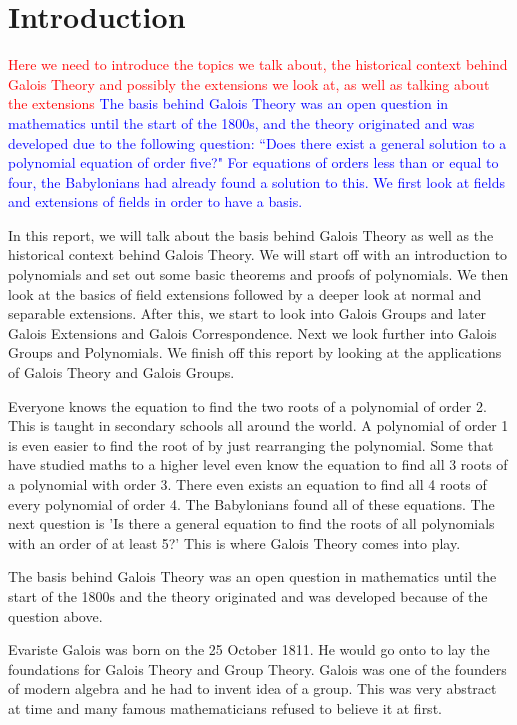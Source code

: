 \section{Introduction}
\textcolor{red}{Here we need to introduce the topics we talk about, the historical context behind Galois Theory and possibly the extensions we look at, as well as talking about the extensions}
\textcolor{blue}{The basis behind Galois Theory was an open question in mathematics until the start of the 1800s, and the theory originated and was developed due to the following question: ``Does there exist a general solution to a polynomial equation of order five?"  For equations of orders less than or equal to four, the Babylonians had already found a solution to this.
We first look at fields and extensions of fields in order to have a basis.}

In this report, we will talk about the basis behind Galois Theory as well as the historical context behind Galois Theory. We will start off with an introduction to polynomials and set out some basic theorems and proofs of polynomials. We then look at the basics of field extensions followed by a deeper look at normal and separable extensions. After this, we start to look into Galois Groups and later Galois Extensions and Galois Correspondence. Next we look further into Galois Groups and Polynomials. We finish off this report by looking at the applications of Galois Theory and Galois Groups.

Everyone knows the equation to find the two roots of a polynomial of order 2. This is taught in secondary schools all around the world. A polynomial of order 1 is even easier to find the root of by just rearranging the polynomial. Some that have studied maths to a higher level even know the equation to find all 3 roots of a polynomial with order 3. There even exists an equation to find all 4 roots of every polynomial of order 4. The Babylonians found all of these equations. The next question is 'Is there a general equation to find the roots of all polynomials with an order of at least 5?' This is where Galois Theory comes into play.

The basis behind Galois Theory was an open question in mathematics until the start of the 1800s and the theory originated and was developed because of the question above.

Evariste Galois was born on the 25 October 1811. He would go onto to lay the foundations for Galois Theory and Group Theory. Galois was one of the founders of modern algebra and he had to invent idea of a group. This was very abstract at time and many famous mathematicians refused to believe it at first.

